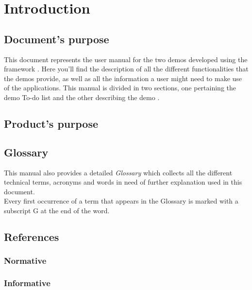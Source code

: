 \section{Introduction}

\subsection{Document's purpose}
This document represents the user manual for the two demos developed using the framework \ProjectName{}. Here you'll find the description of all the different functionalities that the demos provide, as well as all the information a user might need to make use of the applications. This manual is divided in two sections, one pertaining the demo To-do list and the other describing the demo \DemoName{}.  

\subsection{Product's purpose}
\ScopoDelProdottoEng{}

\subsection{Glossary}
This manual also provides a detailed \textit{Glossary} which collects all the different technical terms, acronyms and words in need of further explanation used in this document.\\
Every first occurrence of a term that appears in the Glossary is marked with a subscript G at the end of the word.

\subsection{References}
\subsubsection{Normative}
\subsubsection{Informative}

